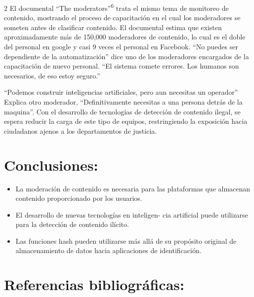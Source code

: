 \documentclass[12pt,spanish,Letterpaper,openany]{book}
\begin{document}
\begin {multicols}{2}
El documental ``The moderators''\textsuperscript{6} trata el mismo tema de monitoreo de contenido, mostrando el proceso de capacitación en el cual los moderadores se someten antes de clasificar contenido. El documental estima que existen aproximadamente más de 150,000 moderadores de contenido, lo cual es el doble del personal en google y casi 9 veces el personal en Facebook. ``No puedes ser dependiente de la automatización'' dice uno de los moderadores encargados de la capacitación de nuevo personal. ``El sistema comete errores. Los humanos son necesarios, de eso estoy seguro.''

``Podemos construir inteligencias artificiales, pero aun necesitas un operador'' Explica otro moderador, ``Definitivamente necesitas a una persona detrás de la maquina''. Con el desarrollo de tecnologías de detección de contenido ilegal, se espera reducir la carga de este tipo de equipos, restringiendo la exposición hacia ciudadanos ajenos a los departamentos de justicia.

\hypertarget{conclusiones-8}{%
\section{Conclusiones:}\label{conclusiones-8}}

\begin{itemize}
\item
  La moderación de contenido es necesaria para las plataformas que almacenan contenido proporcionado por los usuarios.
\item
  El desarrollo de nuevas tecnologías en inteligen-
  cia artificial puede utilizarse para la detección de contenido ilícito.
\item
  Las funciones hash pueden utilizarse más allá de su propósito original de almacenamiento de datos hacia aplicaciones de identificación.
\end{itemize}

\hypertarget{referencias-bibliograficas-8}{%
\section{Referencias bibliográficas:}\label{referencias-bibliograficas-8}}


\end{multicols}
\end{document}
